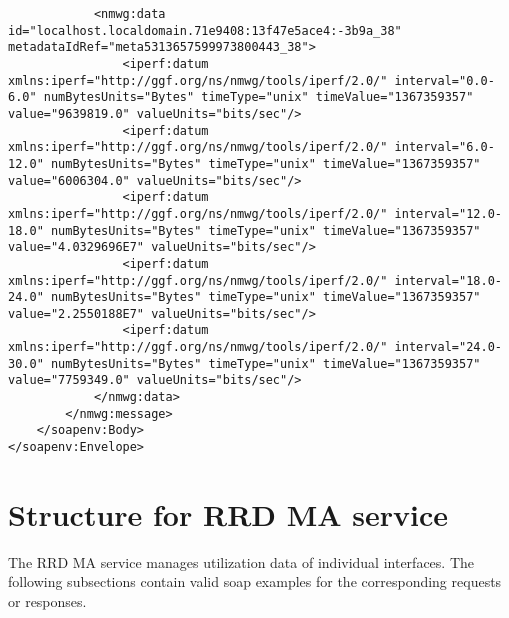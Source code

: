\documentclass[a4paper,12pt,titlepage,hidelinks,fleqn]{article}
\begin{document}
\begin{flushleft}
\begin{framed}
\begin{lstlisting}
			<nmwg:data id="localhost.localdomain.71e9408:13f47e5ace4:-3b9a_38" metadataIdRef="meta5313657599973800443_38">
				<iperf:datum xmlns:iperf="http://ggf.org/ns/nmwg/tools/iperf/2.0/" interval="0.0- 6.0" numBytesUnits="Bytes" timeType="unix" timeValue="1367359357" value="9639819.0" valueUnits="bits/sec"/>
				<iperf:datum xmlns:iperf="http://ggf.org/ns/nmwg/tools/iperf/2.0/" interval="6.0-12.0" numBytesUnits="Bytes" timeType="unix" timeValue="1367359357" value="6006304.0" valueUnits="bits/sec"/>
				<iperf:datum xmlns:iperf="http://ggf.org/ns/nmwg/tools/iperf/2.0/" interval="12.0-18.0" numBytesUnits="Bytes" timeType="unix" timeValue="1367359357" value="4.0329696E7" valueUnits="bits/sec"/>
				<iperf:datum xmlns:iperf="http://ggf.org/ns/nmwg/tools/iperf/2.0/" interval="18.0-24.0" numBytesUnits="Bytes" timeType="unix" timeValue="1367359357" value="2.2550188E7" valueUnits="bits/sec"/>
				<iperf:datum xmlns:iperf="http://ggf.org/ns/nmwg/tools/iperf/2.0/" interval="24.0-30.0" numBytesUnits="Bytes" timeType="unix" timeValue="1367359357" value="7759349.0" valueUnits="bits/sec"/>
			</nmwg:data>
		</nmwg:message>
	</soapenv:Body>
</soapenv:Envelope>
\end{lstlisting}
\end{framed}
\end{flushleft}

\section{Structure for RRD MA  service}
\begin{flushleft}
The RRD MA service manages utilization data of individual interfaces. The following subsections contain valid soap examples for the corresponding requests or responses. 
\end{flushleft}
\end{document}
